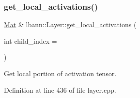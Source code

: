 \subsubsection{\texorpdfstring{get\+\_\+local\+\_\+activations()}{get\_local\_activations()}\hspace{0.1cm}{\footnotesize\ttfamily [1/2]}}
{\footnotesize\ttfamily \hyperlink{base_8hpp_a68f11fdc31b62516cb310831bbe54d73}{Mat} \& lbann\+::\+Layer\+::get\+\_\+local\+\_\+activations (\begin{DoxyParamCaption}\item[{int}]{child\+\_\+index = {} }\end{DoxyParamCaption})}

Get local portion of activation tensor. 

Definition at line 436 of file layer.\+cpp.


